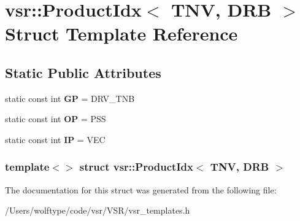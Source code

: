 \hypertarget{structvsr_1_1_product_idx_3_01_t_n_v_00_01_d_r_b_01_4}{\section{vsr\-:\-:Product\-Idx$<$ T\-N\-V, D\-R\-B $>$ Struct Template Reference}
\label{structvsr_1_1_product_idx_3_01_t_n_v_00_01_d_r_b_01_4}
}
\subsection*{Static Public Attributes}
\begin{DoxyCompactItemize}
\item 
\hypertarget{structvsr_1_1_product_idx_3_01_t_n_v_00_01_d_r_b_01_4_a9e3b8e0d6224a07314740214ca09c849}{static const int {\bfseries G\-P} = D\-R\-V\-\_\-\-T\-N\-B}\label{structvsr_1_1_product_idx_3_01_t_n_v_00_01_d_r_b_01_4_a9e3b8e0d6224a07314740214ca09c849}

\item 
\hypertarget{structvsr_1_1_product_idx_3_01_t_n_v_00_01_d_r_b_01_4_a4b8fabac4478ca2e7529461268ffb5ea}{static const int {\bfseries O\-P} = P\-S\-S}\label{structvsr_1_1_product_idx_3_01_t_n_v_00_01_d_r_b_01_4_a4b8fabac4478ca2e7529461268ffb5ea}

\item 
\hypertarget{structvsr_1_1_product_idx_3_01_t_n_v_00_01_d_r_b_01_4_a291e98af8b9ecf209986957ecf5d17f0}{static const int {\bfseries I\-P} = V\-E\-C}\label{structvsr_1_1_product_idx_3_01_t_n_v_00_01_d_r_b_01_4_a291e98af8b9ecf209986957ecf5d17f0}

\end{DoxyCompactItemize}
\subsubsection*{template$<$$>$ struct vsr\-::\-Product\-Idx$<$ T\-N\-V, D\-R\-B $>$}



The documentation for this struct was generated from the following file\-:\begin{DoxyCompactItemize}
\item 
/\-Users/wolftype/code/vsr/\-V\-S\-R/vsr\-\_\-templates.\-h\end{DoxyCompactItemize}
